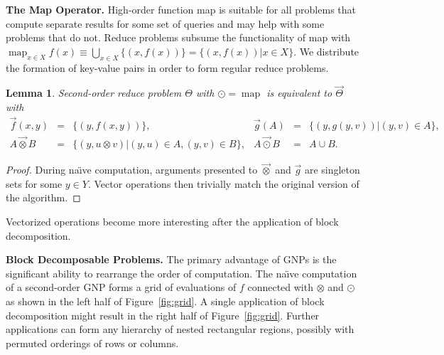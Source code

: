 \documentclass{article}
\newtheorem{lemma}{Lemma}
\newcommand{\maybekillspace}{\vspace{-0.08in}}
\newcommand{\killspace}{\vspace{-0.08in}}
\newcommand{\otimesvec}{\mathbin{\overrightarrow{\otimes}}}
\newcommand{\odotvec}{\mathbin{\overrightarrow{\odot}}}
\DeclareMathOperator*{\map}{map}
\begin{document}
\maybekillspace
{\bf The Map Operator.}  High-order function map is suitable for all
problems that compute separate results for some set of queries and may
help with some problems that do not.  Reduce problems subsume the
functionality of map with $\map_{x \in X} f(x) \equiv \bigcup_{x \in
X} \{(x,f(x))\} = \{(x,f(x)) | x \in X\}$.  We distribute the
formation of key-value pairs in order to form regular reduce problems.
\begin{lemma}
  Second-order reduce problem $\Theta$ with $\odot = \map$ is
  equivalent to $\overrightarrow{\Theta}$ with
  \[ \begin{array}{rclrcl}
    \overrightarrow{f}(x,y) & = & \{(y, f(x,y))\}, & \overrightarrow{g}(A) & = & \{(y, g(y,v)) | (y,v) \in A\}, \\
    A \otimesvec B & = & \{(y, u \otimes v) | (y,u) \in A, (y,v) \in B\}, & A \odotvec B & = & A \cup B.
  \end{array} \]
\end{lemma}
\killspace
\killspace
\begin{proof}
  During na\"{\i}ve computation, arguments presented to $\otimesvec$
  and $\overrightarrow{g}$ are singleton sets for some $y \in Y$.
  Vector operations then trivially match the original version of the
  algorithm.
\end{proof}
\killspace
\noindent Vectorized operations become more interesting after the
application of block decomposition.


{\bf Block Decomposable Problems.} The primary advantage of GNPs is
the significant ability to rearrange the order of computation.  The
na\"{\i}ve computation of a second-order GNP forms a grid of
evaluations of $f$ connected with $\otimes$ and $\odot$ as shown in
the left half of Figure~\ref{fig:grid}.  A single application of block
decomposition might result in the right half of Figure~\ref{fig:grid}.
Further applications can form any hierarchy of nested rectangular
regions, possibly with permuted orderings of rows or columns.
\end{document}
